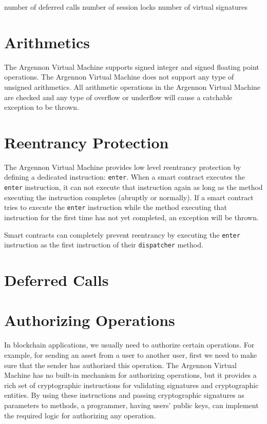 number of deferred calls
number of session locks
number of virtual signatures


\section{Arithmetics}\label{sec:arithmetics}

The Argennon Virtual Machine supports signed integer and signed floating point operations. The Argennon Virtual
Machine does not support any type of unsigned arithmetics. All arithmetic operations in the Argennon Virtual Machine
are checked and any type of overflow or underflow will cause a catchable exception to be thrown.


\section{Reentrancy Protection}\label{sec:reentrancy}

The Argennon Virtual Machine provides low level reentrancy protection by defining a dedicated
instruction: \texttt{enter}. When a smart contract executes the \texttt{enter} instruction, it
can not execute that instruction again as long
as the method executing the instruction completes (abruptly or normally). If a smart contract tries to execute
the \texttt{enter} instruction while the method executing that instruction for the first time has not yet completed,
an exception will be thrown.

Smart contracts can completely prevent reentrancy by executing the \texttt{enter} instruction as the first instruction
of their \texttt{dispatcher} method.


\section{Deferred Calls}\label{sec:deferred-calls}


\section{Authorizing Operations}\label{sec:authorizing-operations}

In blockchain applications, we usually need to authorize certain operations. For example, for sending an asset
from a user to another user, first we need to make sure that the sender has authorized this operation. The
Argennon Virtual Machine has no built-in mechanism for authorizing operations, but it provides a rich set of
cryptographic instructions for validating signatures and cryptographic entities. By using these instructions and
passing cryptographic signatures as parameters to methods, a programmer, having users' public keys, can implement
the required logic for authorizing any operation.

